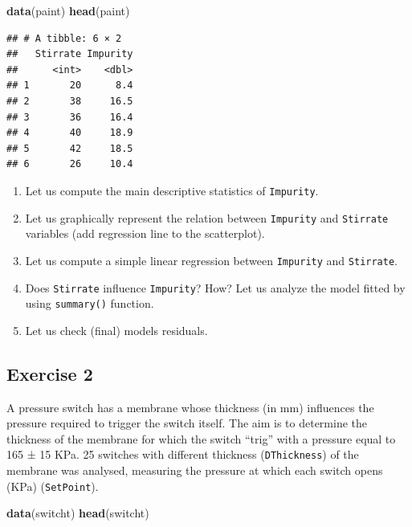\documentclass[]{book}
\newenvironment{Shaded}{\begin{snugshade}}{\end{snugshade}}
\newcommand{\KeywordTok}[1]{\textcolor[rgb]{0.13,0.29,0.53}{\textbf{{#1}}}}
\newcommand{\NormalTok}[1]{{#1}}
\begin{document}
\begin{Shaded}
\begin{Highlighting}[]
\KeywordTok{data}\NormalTok{(paint)}
\KeywordTok{head}\NormalTok{(paint)}
\end{Highlighting}
\end{Shaded}

\begin{verbatim}
## # A tibble: 6 × 2
##   Stirrate Impurity
##      <int>    <dbl>
## 1       20      8.4
## 2       38     16.5
## 3       36     16.4
## 4       40     18.9
## 5       42     18.5
## 6       26     10.4
\end{verbatim}

\begin{enumerate}
\def\labelenumi{\alph{enumi}.}
\item
  Let us compute the main descriptive statistics of \texttt{Impurity}.
\item
  Let us graphically represent the relation between \texttt{Impurity}
  and \texttt{Stirrate} variables (add regression line to the
  scatterplot).
\item
  Let us compute a simple linear regression between \texttt{Impurity}
  and \texttt{Stirrate}.
\item
  Does \texttt{Stirrate} influence \texttt{Impurity}? How? Let us
  analyze the model fitted by using \texttt{summary()} function.
\item
  Let us check (final) models residuals.
\end{enumerate}

\subsection{Exercise 2}\label{exercise-2-8}

A pressure switch has a membrane whose thickness (in mm) influences the
pressure required to trigger the switch itself. The aim is to determine
the thickness of the membrane for which the switch ``trig'' with a
pressure equal to 165 ± 15 KPa. 25 switches with different thickness
(\texttt{DThickness}) of the membrane was analysed, measuring the
pressure at which each switch opens (KPa) (\texttt{SetPoint}).

\begin{Shaded}
\begin{Highlighting}[]
\KeywordTok{data}\NormalTok{(switcht)}
\KeywordTok{head}\NormalTok{(switcht)}
\end{Highlighting}
\end{Shaded}
\end{document}

